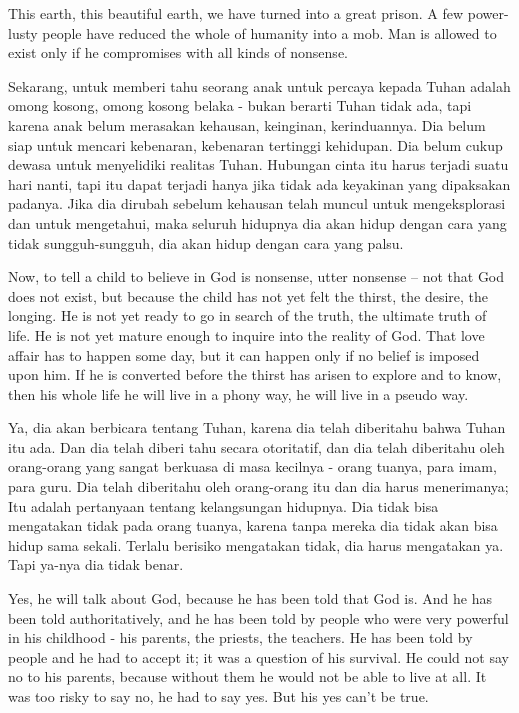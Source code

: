 \english
This earth, this beautiful earth, we have turned into a great prison. A few power-lusty people have reduced the whole of humanity into a mob. Man is allowed to exist only if he compromises with all kinds of nonsense.

\bahasa
Sekarang, untuk memberi tahu seorang anak untuk percaya kepada Tuhan adalah omong kosong, omong kosong belaka - bukan berarti Tuhan tidak ada, tapi karena anak belum merasakan kehausan, keinginan, kerinduannya. Dia belum siap untuk mencari kebenaran, kebenaran tertinggi kehidupan. Dia belum cukup dewasa untuk menyelidiki realitas Tuhan. Hubungan cinta itu harus terjadi suatu hari nanti, tapi itu dapat terjadi hanya jika tidak ada keyakinan yang dipaksakan padanya. Jika dia dirubah sebelum kehausan telah muncul untuk mengeksplorasi dan untuk mengetahui, maka seluruh hidupnya dia akan hidup dengan cara yang tidak sungguh-sungguh, dia akan hidup dengan cara yang palsu.

\english
Now, to tell a child to believe in God is nonsense, utter nonsense -- not that God does not exist, but because the child has not yet felt the thirst, the desire, the longing. He is not yet ready to go in search of the truth, the ultimate truth of life. He is not yet mature enough to inquire into the reality of God. That love affair has to happen some day, but it can happen only if no belief is imposed upon him. If he is converted before the thirst has arisen to explore and to know, then his whole life he will live in a phony way, he will live in a pseudo way.

\bahasa
Ya, dia akan berbicara tentang Tuhan, karena dia telah diberitahu bahwa Tuhan itu ada. Dan dia telah diberi tahu secara otoritatif, dan dia telah diberitahu oleh orang-orang yang sangat berkuasa di masa kecilnya - orang tuanya, para imam, para guru. Dia telah diberitahu oleh orang-orang itu dan dia harus menerimanya; Itu adalah pertanyaan tentang kelangsungan hidupnya. Dia tidak bisa mengatakan tidak pada orang tuanya, karena tanpa mereka dia tidak akan bisa hidup sama sekali. Terlalu berisiko mengatakan tidak, dia harus mengatakan ya. Tapi ya-nya dia tidak benar.

\english
Yes, he will talk about God, because he has been told that God is. And he has been told authoritatively, and he has been told by people who were very powerful in his childhood -  his parents, the priests, the teachers. He has been told by people and he had to accept it; it was a question of his survival. He could not say no to his parents, because without them he would not be able to live at all. It was too risky to say no, he had to say yes. But his yes can't be true.

